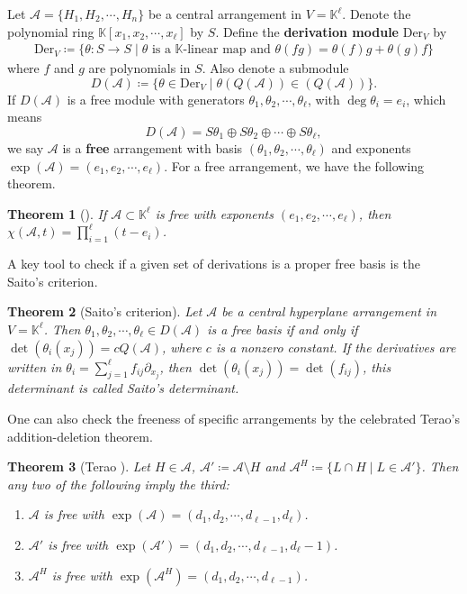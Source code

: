 \documentclass[12pt]{article}
\theoremstyle{plain}%
\newtheorem{theorem}{Theorem}[section]
\theoremstyle{definition}
\begin{document}
Let $\mathcal{A}=\{H_1,H_2,\cdots,H_n\}$ be a central arrangement in $V=\mathbb{K}^\ell$. Denote the polynomial ring $\mathbb{K}[x_1,x_2,\cdots,x_\ell]$ by $S$. Define the \textbf{derivation module} $\mathrm{Der}_V$ by 
    \begin{align*}
        \mathrm{Der}_V\coloneqq \{\theta:S\rightarrow S\mid \theta \text{ is a $\mathbb{K}$-linear map and }\theta(fg)=\theta(f)g+\theta(g)f\}
    \end{align*}
    where $f$ and $g$ are polynomials in $S$. Also denote a submodule
    $$D(\mathcal{A})\coloneqq\{\theta\in \mathrm{Der}_V\mid \theta(Q(\mathcal{A}))\in (Q(\mathcal{A}))\}.$$
 If $D(\mathcal{A})$ is a free module with generators $\theta_1, \theta_2,\cdots,\theta_\ell$, with $\deg \theta_i=e_i$, which means
    $$D(\mathcal{A}) = S\theta_1 \oplus S\theta_2 \oplus \cdots \oplus S\theta_\ell,$$
    we say $\mathcal{A}$ is a \textbf{free} arrangement with basis $(\theta_1, \theta_2,\cdots,\theta_\ell)$ and exponents $\exp(\mathcal{A})=(e_1,e_2,\cdots,e_\ell)$. For a free arrangement, we have the following theorem.

    \begin{theorem}[\cite{terao1981generalized}]
        If $\mathcal{A}\subset \mathbb{K}^\ell$ is free with exponents $(e_1,e_2,\cdots, e_\ell)$, then
    $\chi(\mathcal{A}, t)=\prod_{i=1}^\ell (t-e_i)$.
    \end{theorem}

A key tool to check if a given set of derivations is a proper free basis is the Saito's criterion\cite{saito1980theory}.

\begin{theorem}[Saito's criterion]
    Let $\mathcal{A}$ be a central hyperplane arrangement in $V=\mathbb{K}^\ell$. Then $\theta_1,\theta_2,\cdots,\theta_\ell\in D(\mathcal{A})$ is a free basis if and only if $\det(\theta_i (x_j))=cQ(\mathcal{A})$, where $c$ is a nonzero constant. If the derivatives are written in $\theta_i=\sum_{j=1}^\ell f_{ij}\partial_{x_j}$, then $\det(\theta_i (x_j))=\det(f_{ij})$, this determinant is called Saito's determinant.
\end{theorem}

One can also check the freeness of specific arrangements by the celebrated Terao's addition-deletion theorem.

\begin{theorem}[Terao \cite{terao1980arrangements}]
    Let $H \in \mathcal{A}$, $\mathcal{A}' \coloneqq \mathcal{A} \setminus {H}$ and $\mathcal{A}^H \coloneqq \{L \cap H \mid L \in \mathcal{A}'\}$. Then any two of the following imply the third:
    \begin{enumerate}
        \item $\mathcal{A}$ is free with $\exp(\mathcal{A}) = (d_1, d_2 , \cdots, d_{\ell-1}, d_{\ell})$.
        \item $\mathcal{A}'$ is free with $\exp(\mathcal{A}') = (d_1, d_2 , \cdots, d_{\ell-1}, d_{\ell}-1)$.
        \item $\mathcal{A}^H$ is free with $\exp(\mathcal{A}^H) = (d_1, d_2 , \cdots, d_{\ell-1})$.
    \end{enumerate}
\end{theorem}
\end{document}
